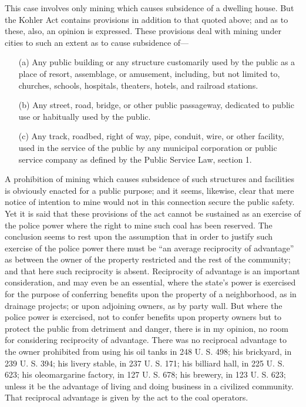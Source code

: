 This case involves only mining which causes subsidence of a dwelling house. But
the Kohler Act contains provisions in addition to that quoted above; and as to
these, also, an opinion is expressed. These provisions deal with mining under
cities to such an extent as to cause subsidence of---
\begin{itemize}
\item[(a)] Any public building or any structure customarily used by the public
as a place of resort, assemblage, or amusement, including, but not limited to,
churches, schools, hospitals, theaters, hotels, and railroad stations.

\item[(b)] Any street, road, bridge, or other public passageway, dedicated to
public use or habitually used by the public.

\item[(c)] Any track, roadbed, right of way, pipe, conduit, wire, or other
facility, used in the service of the public by any municipal corporation or
public service company as defined by the Public Service Law, section 1.
\end{itemize}
A prohibition of mining which causes subsidence of such structures and
facilities is obviously enacted for a public purpose; and it seems, likewise,
clear that mere notice of intention to mine would not in this connection secure
the public safety. Yet it is said that these provisions of the act cannot be
sustained as an exercise of the police power where the right to mine such coal
has been reserved. The conclusion seems to rest upon the assumption that in
order to justify such exercise of the police power there must be ``an average
reciprocity of advantage'' as between the owner of the property restricted and
the rest of the community; and that here such reciprocity is absent. Reciprocity
of advantage is an important consideration, and may even be an essential, where
the state's power is exercised for the purpose of conferring benefits upon the
property of a neighborhood, as in drainage projects; or upon adjoining owners,
as by party wall. But where the police power is exercised, not to confer
benefits upon property owners but to protect the public from detriment and
danger, there is in my opinion, no room for considering reciprocity of
advantage. There was no reciprocal advantage to the owner prohibited from using
his oil tanks in 248 U. S. 498; his brickyard, in 239 U. S. 394; his livery
stable, in 237 U. S. 171; his billiard hall, in 225 U. S. 623; his oleomargarine
factory, in 127 U. S. 678; his brewery, in 123 U. S. 623; unless it be the
advantage of living and doing business in a civilized community. That reciprocal
advantage is given by the act to the coal operators.

